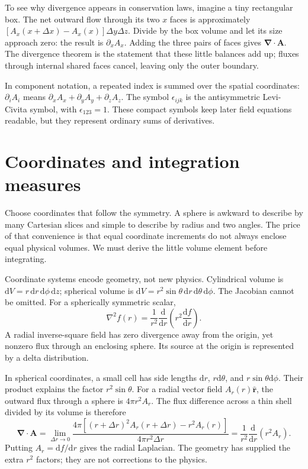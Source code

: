 \documentclass[11pt,oneside]{book}
\newcommand{\dd}{\mathrm{d}}
\newcommand{\vect}[1]{\boldsymbol{#1}}
\newcommand{\grad}{\boldsymbol{\nabla}}
\newcommand{\lap}{\nabla^2}
\newcommand{\od}[2]{\frac{\dd #1}{\dd #2}}
\theoremstyle{reviewstyle}
\begin{document}
To see why divergence appears in conservation laws, imagine a tiny rectangular box. The net outward flow through its two $x$ faces is approximately $[A_x(x+\Delta x)-A_x(x)]\Delta y\Delta z$. Divide by the box volume and let its size approach zero: the result is $\partial_xA_x$. Adding the three pairs of faces gives $\grad\cdot\vect A$. The divergence theorem is the statement that these little balances add up; fluxes through internal shared faces cancel, leaving only the outer boundary.

In component notation, a repeated index is summed over the spatial coordinates: $\partial_iA_i$ means $\partial_xA_x+\partial_yA_y+\partial_zA_z$. The symbol $\epsilon_{ijk}$ is the antisymmetric Levi-Civita symbol, with $\epsilon_{123}=1$. These compact symbols keep later field equations readable, but they represent ordinary sums of derivatives.

\section{Coordinates and integration measures}
Choose coordinates that follow the symmetry. A sphere is awkward to describe by many Cartesian slices and simple to describe by radius and two angles. The price of that convenience is that equal coordinate increments do not always enclose equal physical volumes. We must derive the little volume element before integrating.

Coordinate systems encode geometry, not new physics. Cylindrical volume is $\dd V=r\,\dd r\,\dd\phi\,\dd z$; spherical volume is $\dd V=r^2\sin\theta\,\dd r\,\dd\theta\,\dd\phi$. The Jacobian cannot be omitted. For a spherically symmetric scalar,
\begin{equation}
\lap f(r)=\frac{1}{r^2}\od{}{r}\left(r^2\od{f}{r}\right).
\end{equation}
A radial inverse-square field has zero divergence away from the origin, yet nonzero flux through an enclosing sphere. Its source at the origin is represented by a delta distribution.

In spherical coordinates, a small cell has side lengths $\dd r$, $r\dd\theta$, and $r\sin\theta\dd\phi$. Their product explains the factor $r^2\sin\theta$. For a radial vector field $A_r(r)\hat{\vect r}$, the outward flux through a sphere is $4\pi r^2A_r$. The flux difference across a thin shell divided by its volume is therefore
\begin{equation}
\grad\cdot\vect A=\lim_{\Delta r\to0}
\frac{4\pi[(r+\Delta r)^2A_r(r+\Delta r)-r^2A_r(r)]}{4\pi r^2\Delta r}
=\frac1{r^2}\od{}{r}(r^2A_r).
\end{equation}
Putting $A_r=\dd f/\dd r$ gives the radial Laplacian. The geometry has supplied the extra $r^2$ factors; they are not corrections to the physics.
\end{document}
